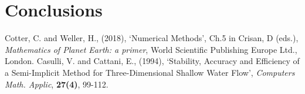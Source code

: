 \documentclass[a4paper,12pt, notitlepage]{report}
\begin{document}
\section*{Conclusions}

\begin{thebibliography}{9}
	Cotter, C. and Weller, H., (2018), \textquoteleft Numerical Methods\textquoteright, Ch.5 in Crisan, D (eds.), \textit{Mathematics of Planet Earth: a primer}, World Scientific Publishing Europe Ltd., London.
	Casulli, V. and Cattani, E., (1994), \textquoteleft Stability, Accuracy and Efficiency of a Semi-Implicit Method for Three-Dimensional Shallow Water Flow\textquoteright, \textit{Computers Math. Applic}, \textbf{27(4)}, 99-112.
\end{thebibliography}
\end{document}
